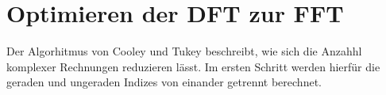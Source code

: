 \section{Optimieren der DFT zur FFT}

Der Algorhitmus von Cooley und Tukey beschreibt, wie sich die Anzahhl komplexer Rechnungen reduzieren lässt. Im ersten Schritt werden hierfür die geraden und ungeraden 
Indizes von einander getrennt berechnet.